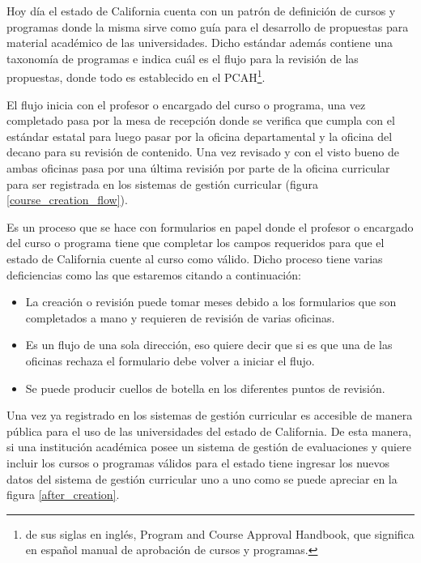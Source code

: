 Hoy día el estado de California cuenta con un patrón de definición de cursos y programas donde la misma sirve como guía para el desarrollo de propuestas para material académico de las universidades. Dicho estándar además contiene una taxonomía de programas e indica cuál es el flujo para la revisión de las propuestas, donde todo es establecido en el PCAH\footnote{de sus siglas en inglés, Program and Course Approval Handbook, que significa en español manual de aprobación de cursos y programas.}.

El flujo inicia con el profesor o encargado del curso o programa, una vez completado pasa por la mesa de recepción donde se verifica que cumpla con el estándar estatal para luego pasar por la oficina departamental y la oficina del decano para su revisión de contenido. Una vez revisado y con el visto bueno de ambas oficinas pasa por una última revisión por parte de la oficina curricular para ser registrada en los sistemas de gestión curricular (figura \ref{course_creation_flow}).

Es un proceso que se hace con formularios en papel donde el profesor o encargado del curso o programa tiene que completar los campos requeridos para que el estado de California cuente al curso como válido. Dicho proceso tiene varias deficiencias como las que estaremos citando a continuación:
\begin{itemize}
	\item La creación o revisión puede tomar meses debido a los formularios que son completados a mano y requieren de revisión de varias oficinas.
	\item Es un flujo de una sola dirección, eso quiere decir que si es que una de las oficinas rechaza el formulario debe volver a iniciar el flujo.
	\item Se puede producir cuellos de botella en los diferentes puntos de revisión.
\end{itemize}

Una vez ya registrado en los sistemas de gestión curricular es accesible de manera pública para el uso de las universidades del estado de California. De esta manera, si una institución académica posee un sistema de gestión de evaluaciones y quiere incluir los cursos o programas válidos para el estado tiene ingresar los nuevos datos del sistema de gestión curricular uno a uno como se puede apreciar en la figura \ref{after_creation}.

